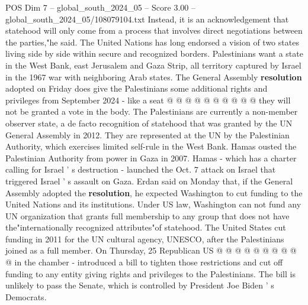 \begin{textsample}{POS Dim 7 – global\_south\_2024\_05 – Score 3.00 – global\_south\_2024\_05/108079104.txt}
Instead, it is an acknowledgement that statehood will only come from a process that involves direct negotiations between the parties,"he said.
The United Nations has long endorsed a vision of two states living side by side within secure and recognized borders.
Palestinians want a state in the West Bank, east Jerusalem and Gaza Strip, all territory captured by Israel in the 1967 war with neighboring Arab states.
The General Assembly \textbf{resolution} adopted on Friday does give the Palestinians some additional rights and privileges from September 2024 - like a seat @ @ @ @ @ @ @ @ @ @ they will not be granted a vote in the body.
The Palestinians are currently a non-member observer state, a de facto recognition of statehood that was granted by the UN General Assembly in 2012.
They are represented at the UN by the Palestinian Authority, which exercises limited self-rule in the West Bank.
Hamas ousted the Palestinian Authority from power in Gaza in 2007.
Hamas - which has a charter calling for Israel ' s destruction - launched the Oct. 7 attack on Israel that triggered Israel ' s assault on Gaza.
Erdan said on Monday that, if the General Assembly adopted the \textbf{resolution}, he expected Washington to cut funding to the United Nations and its institutions.
Under US law, Washington can not fund any UN organization that grants full membership to any group that does not have the"internationally recognized attributes"of statehood.
The United States cut funding in 2011 for the UN cultural agency, UNESCO, after the Palestinians joined as a full member.
On Thursday, 25 Republican US @ @ @ @ @ @ @ @ @ @ in the chamber - introduced a bill to tighten those restrictions and cut off funding to any entity giving rights and privileges to the Palestinians.
The bill is unlikely to pass the Senate, which is controlled by President Joe Biden ' s Democrats.

\end{textsample}
